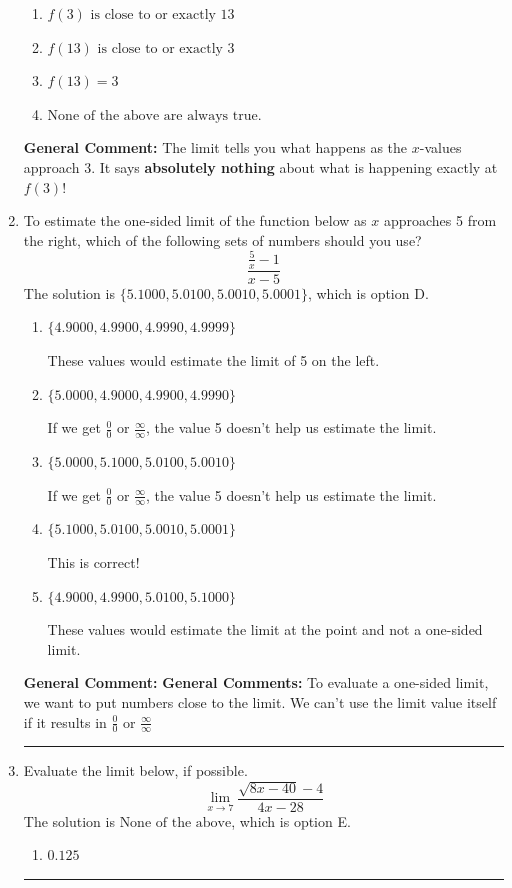 \documentclass{extbook}[14pt]
\newcommand{\litem}[1]{\item #1

\rule{\textwidth}{0.4pt}}
\begin{document}
\begin{enumerate}
{\begin{enumerate}[label=\Alph*.]
\item \( f(3) \text{ is close to or exactly } 13 \)


\item \( f(13) \text{ is close to or exactly } 3 \)


\item \( f(13) = 3 \)


\item \( \text{None of the above are always true.} \)


\end{enumerate}

\textbf{General Comment:} The limit tells you what happens as the $x$-values approach $3$. It says \textbf{absolutely nothing} about what is happening exactly at $f(3)$!
}
\litem{
To estimate the one-sided limit of the function below as $x$ approaches 5 from the right, which of the following sets of numbers should you use?
\[ \frac{\frac{5}{x} - 1}{x - 5} \]The solution is \( \{ 5.1000, 5.0100, 5.0010, 5.0001 \} \), which is option D.\begin{enumerate}[label=\Alph*.]
\item \( \{ 4.9000, 4.9900, 4.9990, 4.9999 \} \)

These values would estimate the limit of 5 on the left.
\item \( \{ 5.0000, 4.9000, 4.9900, 4.9990 \} \)

If we get $\frac{0}{0}$ or $\frac{\infty}{\infty}$, the value 5 doesn't help us estimate the limit.
\item \( \{ 5.0000, 5.1000, 5.0100, 5.0010 \} \)

If we get $\frac{0}{0}$ or $\frac{\infty}{\infty}$, the value 5 doesn't help us estimate the limit.
\item \( \{ 5.1000, 5.0100, 5.0010, 5.0001 \} \)

This is correct!
\item \( \{ 4.9000, 4.9900, 5.0100, 5.1000 \} \)

These values would estimate the limit at the point and not a one-sided limit.
\end{enumerate}

\textbf{General Comment:} \textbf{General Comments:} To evaluate a one-sided limit, we want to put numbers close to the limit. We can't use the limit value itself if it results in $\frac{0}{0}$ or $\frac{\infty}{\infty}$
}
\litem{
Evaluate the limit below, if possible.
\[ \lim_{x \rightarrow 7} \frac{\sqrt{8x - 40} - 4}{4x - 28} \]The solution is \( \text{None of the above} \), which is option E.\begin{enumerate}[label=\Alph*.]
\item \( 0.125 \)


\end{enumerate}}
\end{enumerate}
\end{document}
